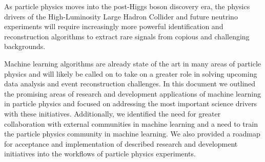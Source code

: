 
As particle physics moves into the post-Higgs boson discovery era, the physics drivers of the High-Luminosity Large Hadron Collider and future neutrino experiments will require increasingly more powerful identification and reconstruction algorithms to extract rare signals from copious and challenging backgrounds.

Machine learning algorithms are already state of the art in many areas of particle physics and will likely be called on to take on a greater role in solving upcoming data analysis and event reconstruction challenges.
In this document we outlined the promising areas of research and development applications of machine learning in particle physics and focused on addressing the most important science drivers with these initiatives.
Additionally, we identified the need for greater collaboration with external communities in machine learning and a need to train the particle physics community in machine learning.
We also provided a roadmap for acceptance and implementation of described research and development initiatives into the workflows of particle physics experiments.
